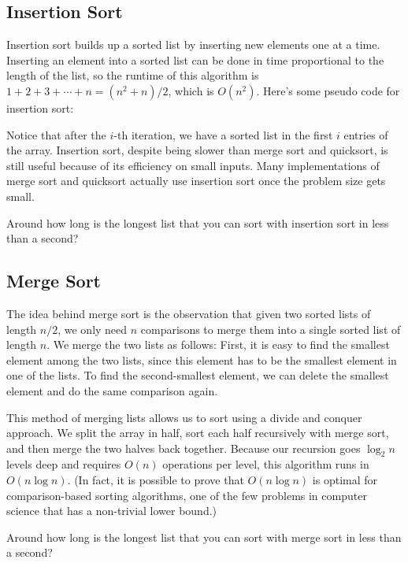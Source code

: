 \subsection{Insertion Sort}

Insertion sort builds up a sorted list by inserting new elements one at a time. Inserting an element into a sorted list can be done in time proportional to the length of the list, so the runtime of this algorithm is $1 + 2 + 3 + \cdots + n = (n^2 + n) / 2$, which is $O(n^2)$. Here's some pseudo code for insertion sort:

Notice that after the $i$-th iteration, we have a sorted list in the first $i$ entries of the array. Insertion sort, despite being slower than merge sort and quicksort, is still useful because of its efficiency on small inputs. Many implementations of merge sort and quicksort actually use insertion sort once the problem size gets small.

\begin{exercise}
  Around how long is the longest list that you can sort with insertion sort in less than a second?
\end{exercise}

\subsection{Merge Sort}

The idea behind merge sort is the observation that given two sorted lists of length $n/2$, we only need $n$ comparisons to merge them into a single sorted list of length $n$. We merge the two lists as follows: First, it is easy to find the smallest element among the two lists, since this element has to be the smallest element in one of the lists. To find the second-smallest element, we can delete the smallest element and do the same comparison again.

This method of merging lists allows us to sort using a divide and conquer approach. We split the array in half, sort each half recursively with merge sort, and then merge the two halves back together. Because our recursion goes $\log_2 n$ levels deep and requires $O(n)$ operations per level, this algorithm runs in $O(n \log n)$. (In fact, it is possible to prove that $O(n \log n)$ is optimal for comparison-based sorting algorithms, one of the few problems in computer science that has a non-trivial lower bound.)

\begin{exercise}
  Around how long is the longest list that you can sort with merge sort in less than a second?
\end{exercise}

